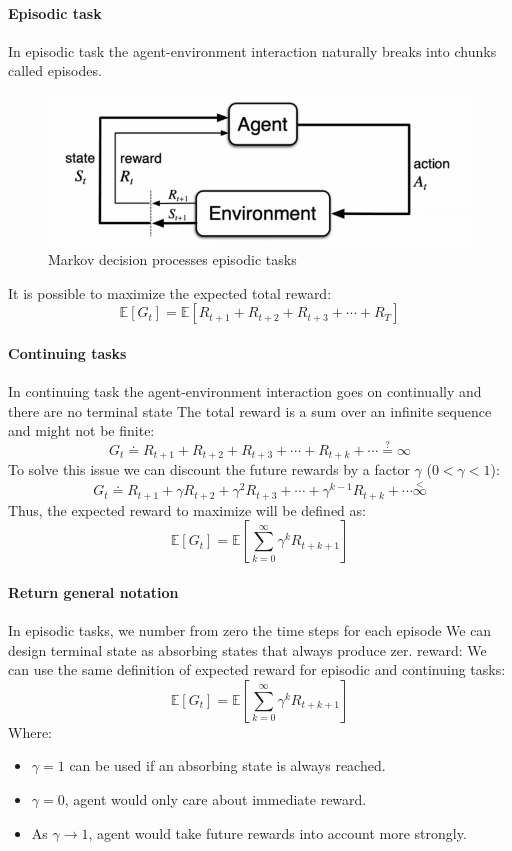 \paragraph*{Episodic task}
In episodic task the agent-environment interaction naturally breaks into chunks called episodes.
\begin{figure}[H]
    \centering
    \includegraphics[width=0.75\linewidth]{images/rl.png}
    \caption{Markov decision processes episodic tasks}
\end{figure}
It is possible to maximize the expected total reward:
\[\mathbb{E}\left[G_t\right]=\mathbb{E}\left[R_{t+1}+R_{t+2}+R_{t+3}+\cdots+R_T\right]\]

\paragraph*{Continuing tasks}
In continuing task the agent-environment interaction goes on continually and
there are no terminal state
The total reward is a sum over an infinite sequence and might not be finite:
\[G_t\doteq R_{t+1}+R_{t+2}+R_{t+3}+\cdots+R_{t+k}+\cdots\overset{?}{=}\infty\]
To solve this issue we can discount the future rewards by a factor $\gamma$ ($0 < \gamma < 1$):
\[G_t\doteq R_{t+1}+\gamma R_{t+2}+\gamma^2R_{t+3}+\cdots+\gamma^{k-1}R_{t+k}+\cdots\overset<\infty\]
Thus, the expected reward to maximize will be defined as:
\[\mathbb{E}\left[G_t\right]=\mathbb{E}\left[\sum_{k=0}^{\infty}\gamma^kR_{t+k+1}\right]\]

\paragraph*{Return general notation}
In episodic tasks, we number from zero the time steps for each episode
We can design terminal state as absorbing states that always produce zer. reward:
We can use the same definition of expected reward for episodic and continuing
tasks:
\[\mathbb{E}\left[G_t\right]=\mathbb{E}\left[\sum_{k=0}^{\infty}\gamma^kR_{t+k+1}\right]\]
Where:
\begin{itemize}
    \item $\gamma = 1$ can be used if an absorbing state is always reached.
    \item $\gamma =0$, agent would only care about immediate reward.
    \item As $\gamma \rightarrow 1$, agent would take future rewards into account more strongly.
\end{itemize}

